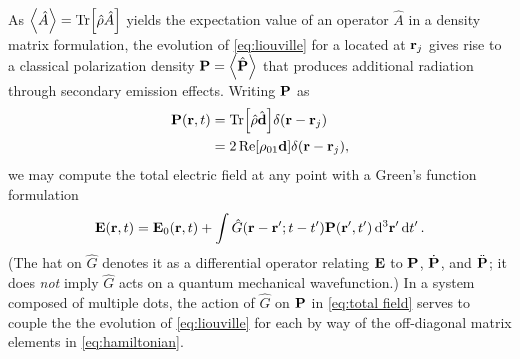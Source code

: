 As $\expval{\hat{A}} = \Tr[\hat{\rho}\hat{A}]$ yields the expectation value of an operator $\hat{A}$ in a density matrix formulation, the evolution of \cref{eq:liouville} for a \qd{} located at $\vb{r}_j$ gives rise to a classical polarization density $\vb{P} = \expval{\hat{\vb{P}}}$ that produces additional radiation through secondary emission effects.
Writing $\vb{P}$ as
\begin{equation}
  \begin{aligned}
    \vb{P}(\vb{r}, t) &= \Tr[\hat{\rho} \hat{\vb{d}}] \delta(\vb{r} - \vb{r}_j) \\
                      &= 2 \Re[\rho_{01}\vb{d}]\delta(\vb{r} - \vb{r}_j),
  \end{aligned}
\end{equation}
we may compute the total electric field at any point with a Green's function formulation
\begin{equation}
  \vb{E}(\vb{r}, t) = \vb{E}_0(\vb{r}, t) + \int \hat{G}(\vb{r} - \vb{r}'; t - t')\vb{P}(\vb{r}', t') \dd[3]{\vb{r}'} \dd{t'}.
  \label{eq:total field}
\end{equation}
(The hat on $\hat{G}$ denotes it as a differential operator relating $\vb{E}$ to $\vb{P}$, $\dot{\vb{P}}$, and $\ddot{\vb{P}}$; it does \emph{not} imply $\hat{G}$ acts on a quantum mechanical wavefunction.)
In a system composed of multiple dots, the action of $\hat{G}$ on $\vb{P}$ in \cref{eq:total field} serves to couple the the evolution of \cref{eq:liouville} for each \qd{} by way of the off-diagonal matrix elements in \cref{eq:hamiltonian}.
